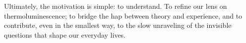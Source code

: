 \vspace{10pt}

Ultimately, the motivation is simple: to understand. To refine our lens on thermoluminescence; to bridge the hap between theory and experience, and to contribute, even in the smallest way, to the slow unraveling of the invisible questions that shape our everyday lives.


\begin{comment}
    This curve is more than just a trace---it is a fingerprint of the radiation dose absorbed by the material, and so it provides clues to pinpoint how much radiation the material has actually been exposed to. Each peak in the curve corresponds to a distinct defect in the crystal's structure, and their properties of intensity and position in the temperature axis can be used to determine the radiation dose. By unraveling the meaning behind these peaks, we uncover the foundation for building a realiable dose-response relationship. By doing so, we gain not just a method, but a powerful lens through which we can peek at the invisible trace of radiation becomes measurable. This quiet transformation ---from light to knowledge--- is the very essence of dosimetry.
\end{comment}
